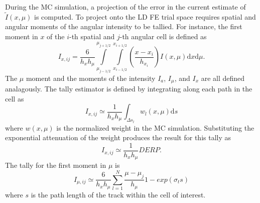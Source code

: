 \documentclass{mc2013}
\renewcommand{\d}{\mathrm{d}}
\begin{document}
During the MC simulation, a projection of the error in the current estimate of
$\tilde{I}(x,\mu)$ is computed.  To project onto the LD FE trial space requires spatial and angular
moments of the angular intensity to be tallied. For instance, the first 
moment in $x$ of the $i$-th spatial and $j$-th angular cell is defined as
\begin{equation}
    I_{x,ij} = \frac{6}{h_xh_\mu}\int\limits_{\mu_{j-1/2}}^{\mu_{j+1/2}}
    \int\limits_{x_{i-1/2}}^{x_{i+1/2}} \left(\frac{x - x_i}{h_{x_i}}\right)
    I(x,\mu) \d x \d \mu.
\end{equation}
The $\mu$ moment and the moments of the intensity $I_a$, $I_\mu$, and $I_x$ are
all defined analagously. The tally estimator is defined by integrating along each
path in the cell as
\begin{equation}
    I_{x,ij} \simeq \frac{1}{h_xh_\mu} \int_{\Delta s_l}  w_l(x,\mu) \d s
\end{equation}
where $w(x,\mu)$ is the normalized weight in the MC simulation. Substituting the
exponential attenuation of the weight produces the result for this tally as
\begin{equation}
    I_{x,ij} \simeq \frac{1}{h_x h_\mu} DERP.
\end{equation}
The tally for the first moment in $\mu$ is 
\begin{equation}
    I_{\mu,ij} \simeq \frac{6}{h_x h_\mu}\sum_{l=1}^N \frac{\mu - \mu_j}{h_\mu}
        1 - exp\left( \sigma_t s \right)
\end{equation}
where $s$ is the path length of the track within the cell of interest.
\end{document}
